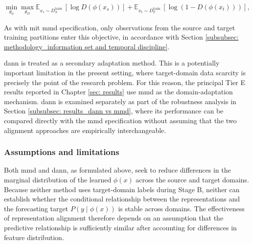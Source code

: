 \begin{equation}
\min _{\theta_\phi} \max _{\theta_D} \mathbb{E}_{x_s \sim D_S^{\text {train }}}\left[\log D\left(\phi\left(x_s\right)\right)\right]+\mathbb{E}_{x_t \sim D_T^{\text {train }}}\left[\log \left(1-D\left(\phi\left(x_t\right)\right)\right)\right] \text {, }
\end{equation}

\noindent As with mit \ac{mmd} specification, only observations from the source and target training partitions enter this objective, in accordance with Section \ref{subsubsec: methodology_information set and temporal discipline}.

\ac{dann} is treated as a secondary adaptation method.  This is a potentially important limitation in the present setting, where target-domain data scarcity is precisely the point of the research problem. For this reason, the principal Tier E results reported in Chapter \ref{sec: results} use \ac{mmd} as the domain-adaptation mechanism. \ac{dann} is examined separately as part of the robustness analysis in Section \ref{subsubsec: results_dann vs mmd}, where its performance can be compared directly with the \ac{mmd} specification without assuming that the two alignment approaches are empirically interchangeable.

\subsubsection{Assumptions and limitations} \label{subsubsec: methodology_stage b_assumptions and limitations}
Both \ac{mmd} and \ac{dann}, as formulated above, seek to reduce differences in the marginal distribution of the learned $\phi(x)$ across the source and target domains. Because neither method uses target-domain labels during Stage B, neither can establish whether the conditional relationship between the representations and the forecasting target $P(y\mid\phi(x))$ is stable across domains. The effectiveness of representation alignment therefore depends on an assumption that the predictive relationship is sufficiently similar after accounting for differences in feature distribution.

